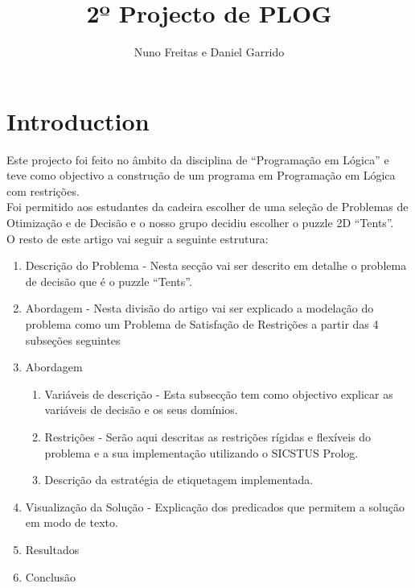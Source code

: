 \documentclass[runningheads,a4paper]{llncs}
\begin{document}
\mainmatter  
\title{2º Projecto de PLOG}

\author{Nuno Freitas e Daniel Garrido} %




\maketitle

\section{Introduction}

Este projecto foi feito no âmbito da disciplina de “Programação em Lógica” e teve como objectivo a construção de um programa em Programação em Lógica com restrições.\\ 
	Foi permitido aos estudantes da cadeira escolher de uma seleção de Problemas de Otimização e de Decisão e o nosso grupo decidiu escolher o puzzle 2D “Tents”.\\ 
	O resto de este artigo vai seguir a seguinte estrutura:\\

\begin{enumerate}  
\item Descrição do Problema - Nesta secção vai ser descrito em detalhe  o problema de decisão que é o puzzle “Tents”.
\item Abordagem - Nesta divisão do artigo vai ser explicado a modelação do problema como um Problema de Satisfação de Restrições a partir das 4 subseções seguintes
\item Abordagem
\begin{enumerate}
\item  Variáveis de descrição - Esta subsecção tem como objectivo explicar as variáveis                      de decisão e os seus domínios.
\item Restrições - Serão aqui descritas as restrições rígidas e flexíveis do problema e a sua implementação utilizando o SICSTUS Prolog.
\item Descrição da estratégia de etiquetagem implementada.
\end{enumerate}
\item Visualização da Solução - Explicação dos predicados que permitem a solução em modo de texto.
\item Resultados
\item Conclusão
\end{enumerate}
\end{document}
